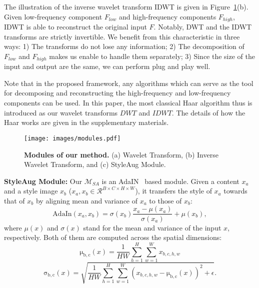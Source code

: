 \documentclass{article}
\begin{document}
The illustration of the inverse wavelet transform IDWT is given in Figure~\ref{fig:modules}(b). Given low-frequency component $F_{low}$ and high-frequency components $F_{high}$, IDWT is able to reconstruct the original input $F$. Notably, DWT and the IDWT transforms are strictly invertible. We benefit from this characteristic in three ways: 1) The transforms do not lose any information; 2) The decomposition of $F_{low}$ and $F_{high}$ makes us enable to handle them separately; 3) Since the size of the input and output are the same, we can perform plug and play well. 


Note that in the proposed framework, any algorithms which can serve as the tool for decomposing and reconstructing the high-frequency and low-frequency components can be used. In this paper, the most classical Haar algorithm thus is introduced as our wavelet transforms $DWT$ and $IDWT$. The details of how the Haar works are given in the supplementary materials.

\begin{figure}[h]
		\centering
		\vspace{-0.15in}
		{\texttt{[image: images/modules.pdf]}}
		\vspace{-0.15in}
		\caption{\textbf{Modules of our method.} (a) Wavelet Transform, (b) Inverse Wavelet Transform, and (c) StyleAug Module. }
		\label{fig:modules} 
		\vspace{-0.15in}
	\end{figure}	


\noindent\textbf{StyleAug Module:} Our $\mathcal{M}_{SA}$ is an  AdaIN~\cite{huang2017arbitrary} based module.  Given a content $x_{a}$ and a style image $x_{b}$ ($x_{a},x_{b}\in\mathcal{R}^{B\times C\times H\times W}$), it transfers the style of $x_{a}$ towards that of $x_{b}$ by aligning mean and variance of $x_{a}$ to those of $x_{b}$:   
	\begin{equation}
	\mathrm{AdaIn}(x_{a},x_{b})=\sigma(x_{b})\frac{x_{a}-\mu(x_{a})}{\sigma(x_{a})}+\mu(x_{b}),
	\end{equation}
	where $\mu(x)$ and $\sigma(x)$ stand for the mean and variance
	of the input $x$, respectively. Both of them are computed across the spatial dimensions:
	\begin{equation}\label{eq:mu}
	\mathrm{\mu_{b,c}}(x)=\frac{1}{HW}\sum_{h=1}^{H}\sum_{w=1}^{W}x_{b,c,h,w}
	\end{equation}
	\begin{equation}\label{eq:sigma}
	\mathrm{\sigma_{b,c}}(x)=\sqrt{\frac{1}{HW}\sum_{h=1}^{H}\sum_{w=1}^{W}(x_{b,c,h,w}-\mathrm{\mu_{b,c}}(x))^{2}+\epsilon}.
	\end{equation}
	
\end{document}
